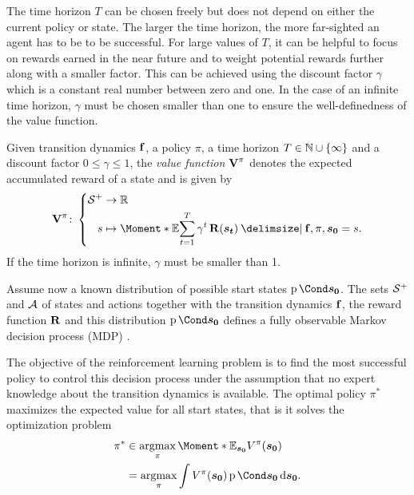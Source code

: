 The time horizon $T$ can be chosen freely but does not depend on either the current policy or state.
The larger the time horizon, the more far-sighted an agent has to be to be successful.
For large values of $T$, it can be helpful to focus on rewards earned in the near future and to weight potential rewards further along with a smaller factor.
This can be achieved using the discount factor $\gamma$ which is a constant real number between zero and one.
In the case of an infinite time horizon, $\gamma$ must be chosen smaller than one to ensure the well-definedness of the value function.

\begin{definition}
    \label{def:value_function}
    Given transition dynamics $\operatorname{\mathbf{f}}$, a policy $\pi$, a time horizon $T \in \mathbb{N} \cup \left\{ \infty \right\}$ and a discount factor $0 \leq \gamma \leq 1$, the \emph{value function $\Vlu^\pi$} denotes the expected accumulated reward of a state and is given by
    \begin{align}
        \Vlu^\pi \colon \left\{
            \begin{aligned}
                \Es^+ &\to \R \\
                s &\mapsto \Moment*{\E}{\sum_{t=1}^T \gamma^t \Rwd(\rv{s_t}) \given \Dyn, \pi, \rv{s_0} = s }.
            \end{aligned}
        \right.
    \end{align}
    If the time horizon is infinite, $\gamma$ must be smaller than 1.
\end{definition}

Assume now a known distribution of possible start states $\Prob{\rv{s_0}}$.
The sets $\mathcal{S}^+$ and $\mathcal{A}$ of states and actions together with the transition dynamics $\operatorname{\mathbf{f}}$, the reward function $\operatorname{\mathbf{R}}$ and this distribution $\Prob{\rv{s_0}}$ defines a fully observable Markov decision process (MDP) \cite{sutton_reinforcement_1998,murphy_machine_2012}.

The objective of the reinforcement learning problem is to find the most successful policy to control this decision process under the assumption that no expert knowledge about the transition dynamics is available.
The optimal policy $\pi^*$ maximizes the expected value for all start states, that is it solves the optimization problem
\begin{align}
    \label{eq:optimal_policy}
    \begin{split}
        \pi^* &\in \argmax_{\pi} \Moment*{\E_{\rv{s_0}}}{V^\pi(\rv{s_0})} \\
        &= \argmax_{\pi} \int V^\pi(\rv{s_0}) \Prob{\rv{s_0}} \diff \rv{s_0}.
    \end{split}
\end{align}

